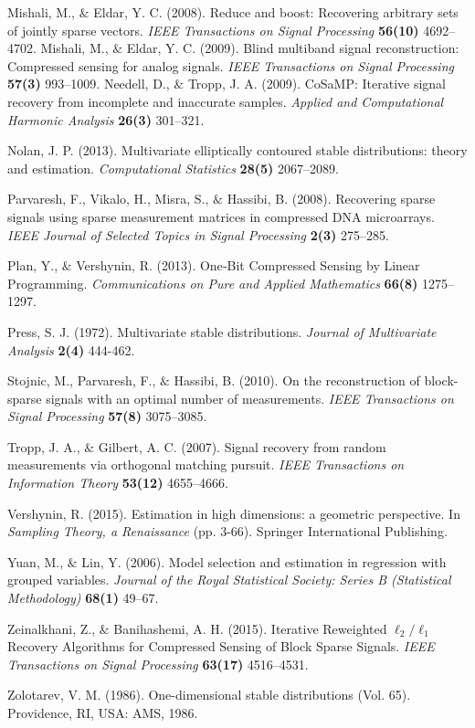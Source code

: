 \documentclass[journal,onecolumn]{IEEEtran}
\begin{document}
\begin{thebibliography}{1}
Mishali, M., $\&$ Eldar, Y. C. (2008). Reduce and boost: Recovering arbitrary sets of jointly sparse vectors. \textit{IEEE Transactions on Signal Processing} \textbf{56(10)} 4692--4702.
Mishali, M., $\&$ Eldar, Y. C. (2009). Blind multiband signal reconstruction: Compressed sensing for analog signals. \textit{IEEE Transactions on Signal Processing} \textbf{57(3)} 993--1009.
Needell, D., $\&$ Tropp, J. A. (2009). CoSaMP: Iterative signal recovery from incomplete and inaccurate samples. \textit{Applied and Computational Harmonic Analysis} \textbf{26(3)} 301--321.


Nolan, J. P. (2013). Multivariate elliptically contoured stable distributions: theory and estimation. \textit{Computational Statistics}
\textbf{28(5)} 2067--2089.

Parvaresh, F., Vikalo, H., Misra, S., $\&$ Hassibi, B. (2008). Recovering sparse signals using sparse measurement matrices in compressed DNA microarrays. \textit{IEEE Journal of Selected Topics in Signal Processing}
\textbf{2(3)} 275--285.

Plan, Y., $\&$ Vershynin, R. (2013). One‐Bit Compressed Sensing by Linear Programming. \textit{Communications on Pure and Applied Mathematics}
\textbf{66(8)} 1275--1297.

Press, S. J. (1972). Multivariate stable distributions. \textit{Journal of Multivariate Analysis}
\textbf{2(4)} 444-462.


Stojnic, M., Parvaresh, F., $\&$ Hassibi, B. (2010). On the reconstruction of block-sparse signals with an optimal number of measurements.
\textit{IEEE Transactions on Signal Processing}
\textbf{57(8)} 3075--3085.

Tropp, J. A., $\&$ Gilbert, A. C. (2007). Signal recovery from random measurements via orthogonal matching pursuit. \textit{IEEE Transactions on Information Theory}
\textbf{53(12)} 4655--4666.

Vershynin, R. (2015). Estimation in high dimensions: a geometric perspective. In \textit{Sampling Theory, a Renaissance} (pp. 3-66). Springer International Publishing.

Yuan, M., $\&$ Lin, Y. (2006). Model selection and estimation in regression with grouped variables.  \textit{Journal of the Royal Statistical Society: Series B (Statistical Methodology)} \textbf{68(1)} 49--67.

Zeinalkhani, Z., $\&$ Banihashemi, A. H. (2015). Iterative Reweighted $\ell_2/\ell_1$ Recovery Algorithms for Compressed Sensing of Block Sparse Signals.
\textit{IEEE Transactions on Signal Processing}
\textbf{63(17)} 4516--4531.

Zolotarev, V. M. (1986). One-dimensional stable distributions (Vol. 65). Providence, RI, USA: AMS, 1986.


\end{thebibliography}
\end{document}
